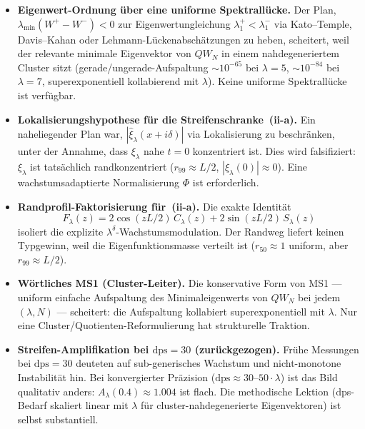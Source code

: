 \documentclass[12pt,a4paper]{article}
\theoremstyle{definition}
\theoremstyle{remark}
\begin{document}
\begin{itemize}
  \item \textbf{Eigenwert-Ordnung über eine uniforme Spektrallücke.} Der
    Plan, $\lambda_{\min}(W^+-W^-)<0$ zur Eigenwertungleichung
    $\lambda_1^+<\lambda_1^-$ via Kato--Temple, Davis--Kahan oder
    Lehmann-Lückenabschätzungen zu heben, scheitert, weil der relevante
    minimale Eigenvektor von $QW_N$ in einem nahdegeneriertem Cluster
    sitzt (gerade/ungerade-Aufspaltung $\sim\!10^{-65}$ bei $\lambda=5$,
    $\sim\!10^{-84}$ bei $\lambda=7$, superexponentiell kollabierend mit
    $\lambda$). Keine uniforme Spektrallücke ist verfügbar.

  \item \textbf{Lokalisierungshypothese für die Streifenschranke~(ii-a).}
    Ein naheliegender Plan war,
    $|\hat\xi_\lambda(x+i\delta)|$ via Lokalisierung zu beschränken,
    unter der Annahme, dass $\xi_\lambda$ nahe $t=0$ konzentriert ist.
    Dies wird falsifiziert: $\xi_\lambda$ ist tatsächlich
    randkonzentriert ($r_{99}\approx L/2$,
    $|\xi_\lambda(0)|\approx 0$). Eine wachstumsadaptierte
    Normalisierung $\Phi$ ist erforderlich.

  \item \textbf{Randprofil-Faktorisierung für~(ii-a).} Die exakte
    Identität
    \[
      F_\lambda(z) = 2\cos(zL/2)\,C_\lambda(z)
                    + 2\sin(zL/2)\,S_\lambda(z)
    \]
    isoliert die explizite $\lambda^\delta$-Wachstumsmodulation. Der
    Randweg liefert keinen Typgewinn, weil die Eigenfunktionsmasse
    verteilt ist ($r_{50}\approx 1$ uniform, aber $r_{99}\approx L/2$).

  \item \textbf{Wörtliches MS1 (Cluster-Leiter).} Die konservative Form
    von MS1 --- uniform einfache Aufspaltung des Minimaleigenwerts von
    $QW_N$ bei jedem $(\lambda,N)$ --- scheitert: die Aufspaltung
    kollabiert superexponentiell mit $\lambda$. Nur eine
    Cluster/Quotienten-Reformulierung hat strukturelle Traktion.

  \item \textbf{Streifen-Amplifikation bei $\mathrm{dps}=30$
    (zurückgezogen).} Frühe Messungen bei $\mathrm{dps}=30$ deuteten
    auf sub-generisches Wachstum und nicht-monotone Instabilität hin.
    Bei konvergierter Präzision
    ($\mathrm{dps}\approx 30\text{--}50\cdot\lambda$) ist das Bild
    qualitativ anders: $A_\lambda(0.4)\approx 1.004$ ist flach. Die
    methodische Lektion (dps-Bedarf skaliert linear mit $\lambda$ für
    cluster-nahdegenerierte Eigenvektoren) ist selbst substantiell.


\end{itemize}
\end{document}
